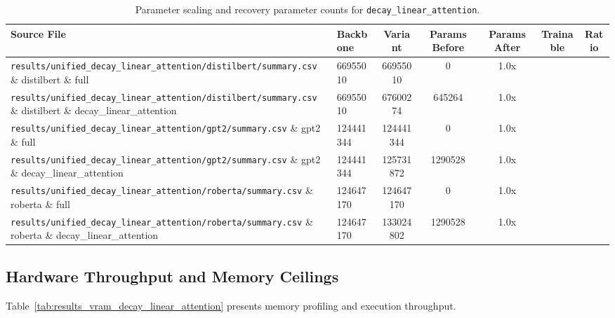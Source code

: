 \begin{table}[t]
\centering
\small
\begin{tabularx}{\linewidth}{llccccc}
\toprule
\textbf{Source File} & \textbf{Backbone} & \textbf{Variant} & \textbf{Params Before} & \textbf{Params After} & \textbf{Trainable} & \textbf{Ratio} \\
\midrule
\texttt{results/unified\_decay\_linear\_attention/distilbert/summary.csv} \& distilbert \& full & 66955010 & 66955010 & 0 & 1.0x \\
\texttt{results/unified\_decay\_linear\_attention/distilbert/summary.csv} \& distilbert \& decay\_linear\_attention & 66955010 & 67600274 & 645264 & 1.0x \\
\texttt{results/unified\_decay\_linear\_attention/gpt2/summary.csv} \& gpt2 \& full & 124441344 & 124441344 & 0 & 1.0x \\
\texttt{results/unified\_decay\_linear\_attention/gpt2/summary.csv} \& gpt2 \& decay\_linear\_attention & 124441344 & 125731872 & 1290528 & 1.0x \\
\texttt{results/unified\_decay\_linear\_attention/roberta/summary.csv} \& roberta \& full & 124647170 & 124647170 & 0 & 1.0x \\
\texttt{results/unified\_decay\_linear\_attention/roberta/summary.csv} \& roberta \& decay\_linear\_attention & 124647170 & 133024802 & 1290528 & 1.0x \\
\bottomrule
\end{tabularx}
\caption{Parameter scaling and recovery parameter counts for \texttt{decay\_linear\_attention}.}
\label{tab:results_params_decay_linear_attention}
\end{table}

\subsection{Hardware Throughput and Memory Ceilings}
Table~\ref{tab:results_vram_decay_linear_attention} presents memory profiling and execution throughput.

